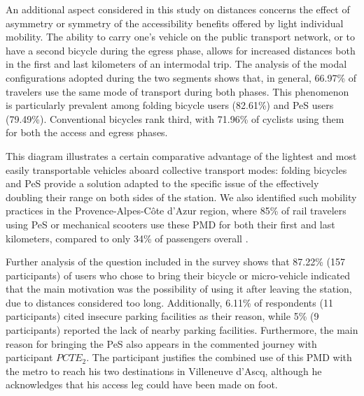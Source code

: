 \begin{refsegment}
An additional aspect considered in this study on distances concerns the effect of asymmetry or symmetry of the accessibility benefits offered by light individual mobility. The ability to carry one's vehicle on the public transport network, or to have a second bicycle during the egress phase, allows for increased distances both in the first and last kilometers of an intermodal trip. The analysis of the modal configurations adopted during the two segments shows that, in general, 66.97\% of travelers use the same mode of transport during both phases. This phenomenon is particularly prevalent among folding bicycle users (82.61\%) and \acrshort{PeS} users (79.49\%). Conventional bicycles rank third, with 71.96\% of cyclists using them for both the access and egress phases.%

This diagram illustrates a certain comparative advantage of the lightest and most easily transportable vehicles aboard collective transport modes: folding bicycles and \acrshort{PeS} provide a solution adapted to the specific issue of the  effectively doubling their range on both sides of the station. We also identified such mobility practices in the Provence-Alpes-Côte d'Azur region, where 85\% of rail travelers using \acrshort{PeS} or mechanical scooters use these \acrshort{PMD} for both their first and last kilometers, compared to only 34\% of passengers overall \textcolor{blue}{\autocite[185]{moinse_intermodal_2022}}.%

Further analysis of the question  included in the survey shows that 87.22\% (157 participants) of users who chose to bring their bicycle or micro-vehicle indicated that the main motivation was the possibility of using it after leaving the station, due to distances considered too long. Additionally, 6.11\% of respondents (11 participants) cited insecure parking facilities as their reason, while 5\% (9 participants) reported the lack of nearby parking facilities. Furthermore, the main reason for bringing the \acrshort{PeS} also appears in the commented journey with participant \(PCTE_{2}\). The participant justifies the combined use of this \acrshort{PMD} with the metro to reach his two destinations in Villeneuve d'Ascq, although he acknowledges that his access leg could have been made on foot.%


\end{refsegment}
